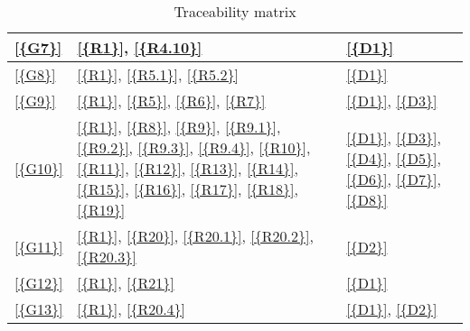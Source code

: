 \begin{table}[H]
\begin{tabular}{|l|p{8cm}|p{5cm}|}
            \ref{{G7}}       & \ref{{R1}}, \ref{{R4.10}}                                                                                                                                                                                                    & \ref{{D1}}                                                                         \\\hline
            \ref{{G8}}       & \ref{{R1}}, \ref{{R5.1}}, \ref{{R5.2}}                                                                                                                                                                                       & \ref{{D1}}                                                                         \\\hline
            \ref{{G9}}       & \ref{{R1}}, \ref{{R5}}, \ref{{R6}}, \ref{{R7}}                                                                                                                                                                               & \ref{{D1}}, \ref{{D3}}                                                             \\\hline
            \ref{{G10}}      & \ref{{R1}}, \ref{{R8}}, \ref{{R9}}, \ref{{R9.1}}, \ref{{R9.2}}, \ref{{R9.3}}, \ref{{R9.4}}, \ref{{R10}}, \ref{{R11}}, \ref{{R12}}, \ref{{R13}}, \ref{{R14}}, \ref{{R15}}, \ref{{R16}}, \ref{{R17}}, \ref{{R18}}, \ref{{R19}} & \ref{{D1}}, \ref{{D3}}, \ref{{D4}}, \ref{{D5}}, \ref{{D6}}, \ref{{D7}}, \ref{{D8}} \\\hline
            \ref{{G11}}      & \ref{{R1}}, \ref{{R20}}, \ref{{R20.1}}, \ref{{R20.2}}, \ref{{R20.3}}                                                                                                                                                         & \ref{{D2}}                                                                         \\\hline
            \ref{{G12}}      & \ref{{R1}}, \ref{{R21}}                                                                                                                                                                                                      & \ref{{D1}}                                                                         \\\hline
            \ref{{G13}}      & \ref{{R1}}, \ref{{R20.4}}                                                                                                                                                                                                    & \ref{{D1}}, \ref{{D2}}                                                             \\\hline
      \end{tabular}
      \caption{Traceability matrix}
      \label{table:Traceability matrix}
\end{table}

